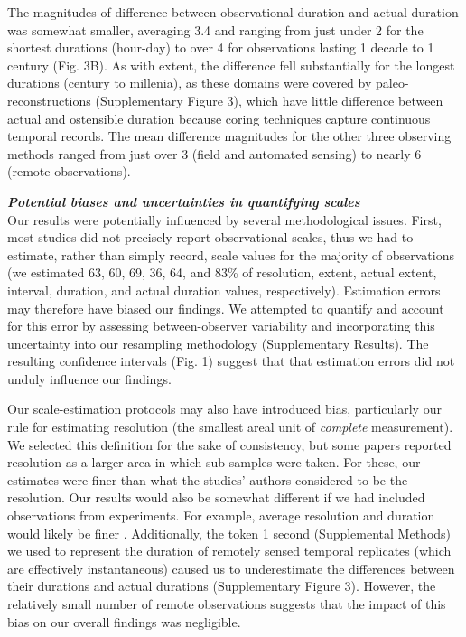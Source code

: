\documentclass[12pt]{article}
\begin{document}
The magnitudes of difference between observational duration and actual duration was somewhat smaller, averaging 3.4 and ranging from just under 2 for the shortest durations (hour-day) to over 4 for observations lasting 1 decade to 1 century (Fig. 3B). As with extent, the difference fell substantially for the longest durations (century to millenia), as these domains were covered by paleo-reconstructions (Supplementary Figure 3), which have little difference between actual and ostensible duration because coring techniques capture continuous temporal records. The mean difference magnitudes for the other three observing methods ranged from just over 3 (field and automated sensing) to nearly 6 (remote observations). 

\vspace{5pt}
\noindent \textbf{\emph{Potential biases and uncertainties in quantifying scales}}\\
Our results were potentially influenced by several methodological issues. First, most studies did not precisely report observational scales, thus we had to estimate, rather than simply record, scale values for the majority of observations (we estimated 63, 60, 69, 36, 64, and 83\% of resolution, extent, actual extent, interval, duration, and actual duration values, respectively). Estimation errors may therefore have biased our findings. We attempted to quantify and account for this error by assessing between-observer variability and incorporating this uncertainty into our resampling methodology (Supplementary Results). The resulting confidence intervals (Fig. 1) suggest that that estimation errors did not unduly influence our findings. 

Our scale-estimation protocols may also have introduced bias, particularly our rule for estimating resolution (the smallest areal unit of \emph{complete} measurement). We selected this definition for the sake of consistency, but some papers reported resolution as a larger area in which sub-samples were taken. For these, our estimates were finer than what the studies' authors considered to be the resolution. Our results would also  be somewhat different if we had included observations from experiments. For example, average resolution and duration would likely be finer \cite{tilman_ecological_1989,kareiva_spatial_1988}. Additionally, the token 1 second (Supplemental Methods) we used to represent the duration of remotely sensed temporal replicates (which are effectively instantaneous) caused us to underestimate the differences between their durations and actual durations (Supplementary Figure 3). However, the relatively small number of remote observations suggests that the impact of this bias on our overall findings was negligible.  
\end{document}
